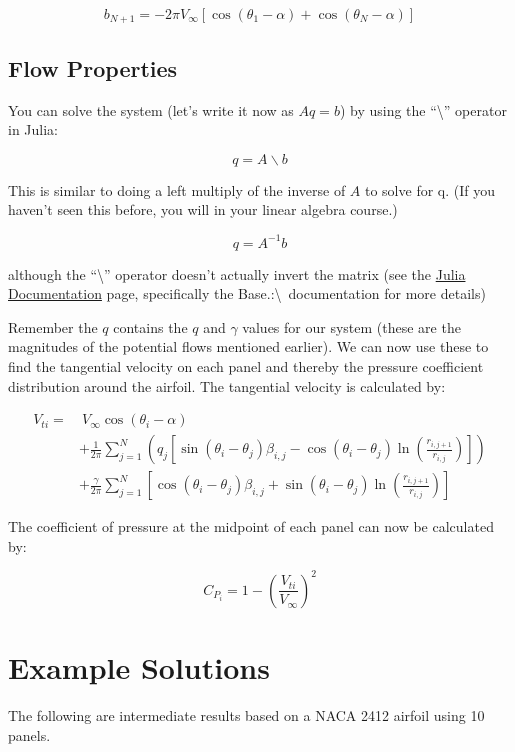 \documentclass{article}%
\begin{document}
\begin{equation}
	b_{N+1} = -2\pi V_{\infty} \left[ \cos(\theta_1 - \alpha) + \cos(\theta_N - \alpha) \right]
\end{equation}

\subsection*{Flow Properties}

You can solve the system (let's write it now as $Aq=b$) by using the ``\textbackslash'' operator in Julia:

\begin{equation}
q = A \backslash b
\end{equation}

This is similar to doing a left multiply of the inverse of $A$ to solve for q. (If you haven't seen this before, you will in your linear algebra course.)

\begin{equation}
	q = A^{-1} b
\end{equation}

\noindent although the ``\textbackslash'' operator doesn't actually invert the matrix (see the \href{https://docs.julialang.org/en/v1/stdlib/LinearAlgebra/}{Julia Documentation} page, specifically the Base.:\textbackslash~documentation for more details)

Remember the $q$ contains the $q$ and $\gamma$ values for our system (these are the magnitudes of the potential flows mentioned earlier). We can now use these to find the tangential velocity on each panel and thereby the pressure coefficient distribution around the airfoil.  The tangential velocity is calculated by:

\begin{equation}
	\begin{aligned}
		V_{ti} =& ~V_\infty \cos(\theta_i-\alpha) \\
		&+ \frac{1}{2\pi} \sum_{j=1}^N \left( q_j\left[ \sin(\theta_i-\theta_j)\beta_{i,j} - \cos(\theta_i-\theta_j) \ln\left(\frac{r_{i,j+1}}{r_{i,j}}\right) \right] \right)\\
		&+ \frac{\gamma}{2\pi} \sum_{j=1}^N \left[ \cos(\theta_i-\theta_j)\beta_{i,j} + \sin(\theta_i-\theta_j) \ln\left(\frac{r_{i,j+1}}{r_{i,j}}\right) \right]
	\end{aligned}
\end{equation}

The coefficient of pressure at the midpoint of each panel can now be calculated by:

\begin{equation}
	C_{P_i} = 1- \left(\frac{V_{ti}}{V_\infty}\right)^2
\end{equation}


\section*{Example Solutions}

The following are intermediate results based on a NACA 2412 airfoil using 10 panels.
\end{document}
